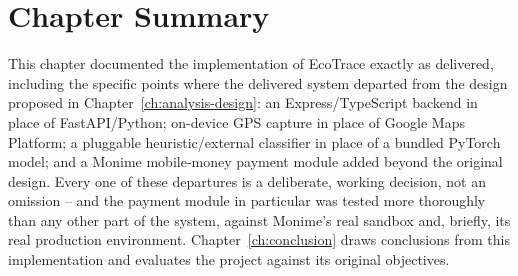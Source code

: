 \section{Chapter Summary}

This chapter documented the implementation of EcoTrace exactly as
delivered, including the specific points where the delivered system departed
from the design proposed in Chapter~\ref{ch:analysis-design}: an
Express/TypeScript backend in place of FastAPI/Python; on-device GPS
capture in place of Google Maps Platform; a pluggable heuristic/external
classifier in place of a bundled PyTorch model; and a Monime mobile-money
payment module added beyond the original design. Every one of these
departures is a deliberate, working decision, not an omission -- and the
payment module in particular was tested more thoroughly than any other part
of the system, against Monime's real sandbox and, briefly, its real production
environment. Chapter~\ref{ch:conclusion} draws conclusions from this
implementation and evaluates the project against its original objectives.